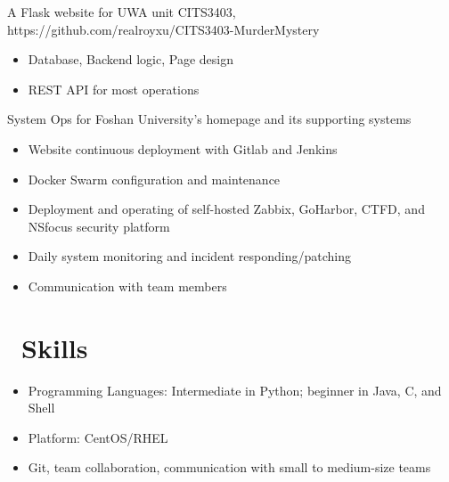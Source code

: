 \documentclass{resume}
\begin{document}
A Flask website for UWA unit CITS3403, https://github.com/realroyxu/CITS3403-MurderMystery
\begin{itemize}
  \item Database, Backend logic, Page design
  \item REST API for most operations
\end{itemize}

System Ops for Foshan University's homepage and its supporting systems
\begin{itemize}
  \item Website continuous deployment with Gitlab and Jenkins
  \item Docker Swarm configuration and maintenance
  \item Deployment and operating of self-hosted Zabbix, GoHarbor, CTFD, and NSfocus security platform
  \item Daily system monitoring and incident responding/patching
  \item Communication with team members
\end{itemize}


\section{\faCogs\ Skills}
\begin{itemize}[parsep=0.5ex]
  \item Programming Languages: Intermediate in Python; beginner in Java, C, and Shell
  \item Platform: CentOS/RHEL
  \item Git, team collaboration, communication with small to medium-size teams
\end{itemize}

\end{document}
